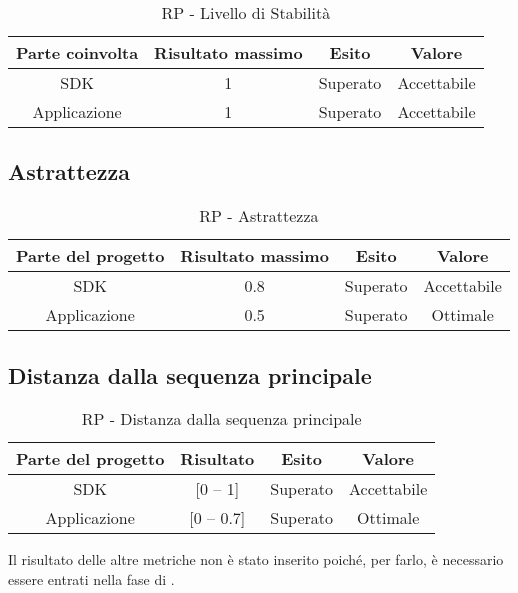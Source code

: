 \begin{table}[h]
\begin{center}
	\begin{tabular}{|c|c|c|c|}
	\hline
	\textbf{Parte coinvolta} & \textbf{Risultato massimo} & \textbf{Esito} & \textbf{Valore} \\
	\hline
	SDK & 1 & Superato & Accettabile \\
	\hline
	Applicazione & 1 & Superato & Accettabile \\
	\hline
	\end{tabular}
\end{center}
\caption{RP - Livello di Stabilità}
\end{table}

\newpage

\subsection{Astrattezza}

\begin{table}[h]
\begin{center}
	\begin{tabular}{|c|c|c|c|}
	\hline
	\textbf{Parte del progetto} & \textbf{Risultato massimo} & \textbf{Esito} & \textbf{Valore} \\
	\hline
	SDK & 0.8 & Superato & Accettabile \\
	\hline
	Applicazione & 0.5 & Superato & Ottimale \\
	\hline
	\end{tabular}
\end{center}
\caption{RP - Astrattezza}
\end{table}

\subsection{Distanza dalla sequenza principale}

\begin{table}[h]
\begin{center}
	\begin{tabular}{|c|c|c|c|}
	\hline
	\textbf{Parte del progetto} & \textbf{Risultato} & \textbf{Esito} & \textbf{Valore} \\
	\hline
	SDK & [0 -- 1] & Superato & Accettabile\\
	\hline
	Applicazione & [0 -- 0.7] & Superato & Ottimale \\
	\hline
	\end{tabular}
\end{center}
\caption{RP - Distanza dalla sequenza principale}
\end{table}

Il risultato delle altre metriche non è stato inserito poiché, per farlo, è necessario essere entrati nella fase di \COD.
